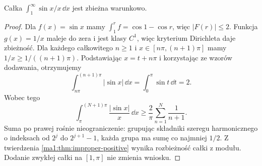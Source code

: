 \begin{przyklad}
\label{ma1:ex:improper-sinx-over-x}
Całka $\int_1^\infty \sin x/x\,\dd x$ jest zbieżna warunkowo.
\end{przyklad}
\begin{proof}
Dla $f(x)=\sin x$ mamy $\int_1^r f=\cos1-\cos r$, więc $|F(r)|\le2$. Funkcja $g(x)=1/x$ maleje do zera i jest klasy $C^1$, więc kryterium Dirichleta daje zbieżność. Dla każdego całkowitego $n\ge1$ i $x\in[n\pi,(n+1)\pi]$ mamy $1/x\ge1/((n+1)\pi)$. Podstawiając $x=t+n\pi$ i korzystając ze wzorów dodawania, otrzymujemy
\[
 \int_{n\pi}^{(n+1)\pi}|\sin x|\,\dd x
 =\int_0^\pi\sin t\,\dd t=2.
\]
Wobec tego
\[
 \int_\pi^{(N+1)\pi}\frac{|\sin x|}{x}\,\dd x
 \ge\frac2\pi\sum_{n=1}^{N}\frac1{n+1}.
\]
Suma po prawej rośnie nieograniczenie: grupując składniki szeregu harmonicznego o indeksach od $2^j$ do $2^{j+1}-1$, każda grupa ma sumę co najmniej $1/2$. Z twierdzenia \ref{ma1:thm:improper-positive} wynika rozbieżność całki z modułu. Dodanie zwykłej całki na $[1,\pi]$ nie zmienia wniosku.
\end{proof}

